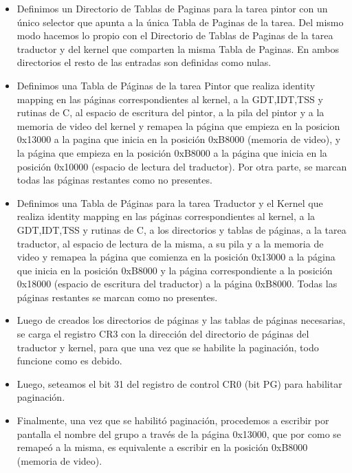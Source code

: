 \begin{itemize}
 \item Definimos un Directorio de Tablas de Paginas para la tarea pintor con un \'unico selector que apunta a la \'unica Tabla de Paginas de la tarea. Del mismo modo hacemos lo propio con el Directorio de Tablas de Paginas de la tarea traductor y del kernel que comparten la misma Tabla de Paginas. En ambos directorios el resto de las entradas son definidas como nulas.
 \item Definimos una Tabla de P\'aginas de la tarea Pintor que realiza identity mapping en las p\'aginas correspondientes al kernel, a la GDT,IDT,TSS y rutinas de C, al espacio de escritura del pintor, a la pila del pintor y a la memoria de video del kernel y remapea la p\'agina que empieza en la posicion 0x13000 a la pagina que inicia en la posici\'on 0xB8000 (memoria de video), y la p\'agina que empieza en la posici\'on 0xB8000 a la p\'agina que inicia en la posici\'on 0x10000 (espacio de lectura del traductor). Por otra parte, se marcan todas las p\'aginas restantes como no presentes.
 \item Definimos una Tabla de P\'aginas para la tarea Traductor y el Kernel que realiza identity mapping en las p\'aginas correspondientes al kernel, a la GDT,IDT,TSS y rutinas de C, a los directorios y tablas de p\'aginas, a la tarea traductor, al espacio de lectura de la misma, a su pila y a la memoria de video y remapea la p\'agina que comienza en la posici\'on 0x13000 a la p\'agina que inicia en la posici\'on 0xB8000 y la p\'agina correspondiente a la posici\'on 0x18000 (espacio de escritura del traductor) a la p\'agina 0xB8000. Todas las p\'aginas restantes se marcan como no presentes.
 \item Luego de creados los directorios de p\'aginas y las tablas de p\'aginas necesarias, se carga el registro CR3 con la direcci\'on del directorio de p\'aginas del traductor y kernel, para que una vez que se habilite la paginaci\'on, todo funcione como es debido.
 \item Luego, seteamos el bit 31 del registro de control CR0 (bit PG) para habilitar paginaci\'on.
 \item Finalmente, una vez que se habilit\'o paginaci\'on, procedemos a escribir por pantalla el nombre del grupo a trav\'es de la p\'agina 0x13000, que por como se remape\'o a la misma, es equivalente a escribir en la posici\'on 0xB8000 (memoria de video).
\end{itemize}

